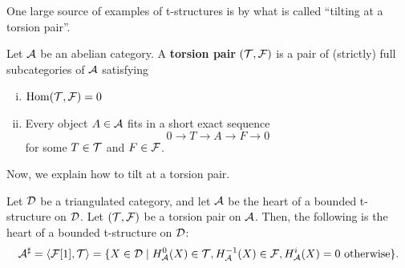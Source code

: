 \documentclass[12pt]{article}
\begin{document}
One large source of examples of t-structures is by what is called ``tilting at a torsion pair''.

\begin{defn}
    Let $\mathcal{A}$ be an abelian category. A \textbf{torsion pair} $(\mathcal{T},\mathcal{F})$ is a pair of (strictly) full subcategories of $\mathcal{A}$ satisfying
    \begin{enumerate}[(i)]
        \item $\mathrm{Hom}(\mathcal{T},\mathcal{F}) = 0$
        \item Every object $A \in \mathcal{A}$ fits in a short exact sequence
        \[0\to T \to A \to F \to 0\]
        for some $T\in \mathcal{T}$ and $F\in \mathcal{F}$.
    \end{enumerate}
\end{defn}




Now, we explain how to tilt at a torsion pair.

\begin{thmdef}
    Let $\mathcal{D}$ be a triangulated category, and let $\mathcal{A}$ be the heart of a bounded t-structure on $\mathcal{D}$. Let $(\mathcal{T},\mathcal{F})$ be a torsion pair on $\mathcal{A}$. Then, the following is the heart of a bounded t-structure on $\mathcal{D}$:
    \[\mathcal{A}^\sharp = \left\langle\mathcal{F}[1],\mathcal{T}\right\rangle = \{X\in \mathcal{D} \mid H_{\mathcal{A}}^0(X) \in \mathcal{T}, H_{\mathcal{A}}^{-1}(X) \in \mathcal{F}, H_{\mathcal{A}}^i(X)=0 \text{ otherwise}\}.\]
\end{thmdef}
\end{document}
